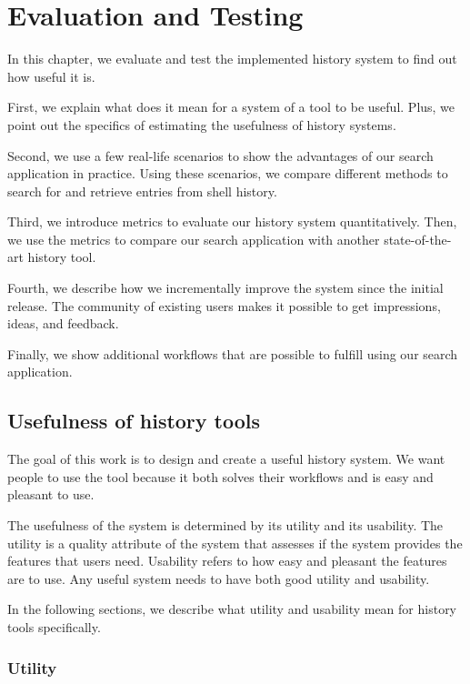 
\chapter{Evaluation and Testing}

In this chapter, we evaluate and test the implemented history system to find out how useful it is.

First, we explain what does it mean for a system of a tool to be useful. Plus, we point out the specifics of estimating the usefulness of history systems.

Second, we use a few real-life scenarios to show the advantages of our search application in practice. Using these scenarios, we compare different methods to search for and retrieve entries from shell history.

Third, we introduce metrics to evaluate our history system quantitatively. Then, we use the metrics to compare our search application with another state-of-the-art history tool.

Fourth, we describe how we incrementally improve the system since the initial release. The community of existing users makes it possible to get impressions, ideas, and feedback. 

Finally, we show additional workflows that are possible to fulfill using our search application. 

\section{Usefulness of history tools}

The goal of this work is to design and create a useful history system. 
We want people to use the tool because it both solves their workflows and is easy and pleasant to use.

The usefulness of the system is determined by its utility and its usability.\cite{nielsen2012usability} The utility is a quality attribute of the system that assesses if the system provides the features that users need.\cite{nielsen2012usability} Usability refers to how easy and pleasant the features are to use. Any useful system needs to have both good utility and usability.

In the following sections, we describe what utility and usability mean for history tools specifically.

\subsection{Utility}

